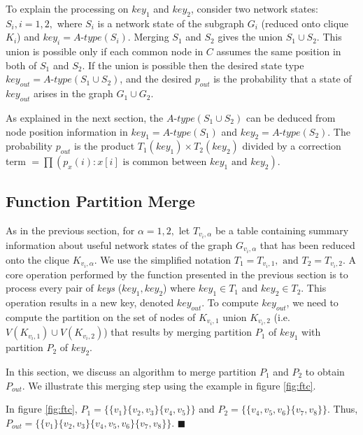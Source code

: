 To explain the processing on $key_1$ and $key_2$, consider two network states: $S_i, i=1, 2,$ where $S_i$ is a network state of the subgraph $G_i$ (reduced onto clique $K_i$) and $key_i=A\mbox{-}type(S_i)$.
Merging $S_1$ and $S_2$ gives the union $S_1\cup S_2$. This union is possible only if each common node in $C$ assumes the same position in both of $S_1$ and $S_2$. If the union is possible then the desired state type $key_{out}=A\mbox{-}type(S_1\cup S_2)$, and the desired $p_{out}$ is the probability that a state of $key_{out}$ arises in the graph $G_1 \cup G_2$. 

As explained in the next section, the $A\mbox{-}type(S_1\cup S_2)$ can be deduced from node position information in $key_1=A\mbox{-}type(S_1)$ and $key_2=A\mbox{-}type(S_2)$. The probability $p_{out}$ is the product $T_1(key_1)\times T_2(key_2)$ divided by a correction term $=\prod (p_x(i):x[i] \mbox{ is common between } key_1 \mbox{ and } key_2)$.


\subsection{Function Partition Merge }
\label{subsub:fMpar}
As in the previous section, for $\alpha=1, 2,$ let $T_{v_i,\alpha}$ be a table containing summary information about useful network states 
of the graph $G_{v_i,\alpha}$ that has been reduced onto the clique $K_{v_i,\alpha}$. We use the simplified notation $T_1=T_{v_i,1}, \mbox{ and } T_2=T_{v_i,2}$. A core operation performed by the function presented in the previous section is to process every pair of \textit{keys} ($key_1,key_2$) where $key_1\in T_1$ and $key_2\in T_2$. This operation results in a new key, denoted $key_{out}$. To compute $key_{out}$, we need to compute the partition on the set of nodes of $K_{v_i,1}$ union $K_{v_i,2}$ (i.e. $V(K_{v_i,1})\cup V(K_{v_i,2})$) that results by merging partition $P_1$ of $key_1$ with partition $P_2$ of $key_2$.

In this section, we discuss an algorithm to merge partition $P_1$ and $P_2$ to obtain $P_{out}$. We illustrate this merging step using the example in figure \ref{fig:ftc}.

\begin{example}
\normalfont
In figure \ref{fig:ftc}, $P_1=\{\{v_1\}\{v_2,v_3\}\{v_4,v_5\}\}$ and $P_2=\{\{v_4,v_5,v_6\}\{v_7,v_8\}\}$. Thus,  $P_{out}=\{\{v_1\}\{v_2,v_3\}\{v_4,v_5,v_6\}\{v_7,v_8\}\}$. $\blacksquare$
\end{example}


